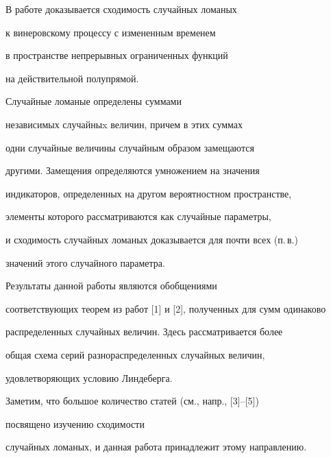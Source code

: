 \pagestyle{plain} %







\maketitle


\label{begin}








В работе доказывается сходимость случайных ломаных


к винеровскому процессу с измененным временем


в пространстве непрерывных ограниченных функций


на действительной полупрямой.


Случайные ломаные определены суммами


независимых случайныx величин, причем в этих суммах


одни случайные величины случайным образом замещаются


другими. Замещения определяются умножением на значения


индикаторов, определенных на другом вероятностном пространстве,


элементы которого рассматриваются как случайные параметры,


и сходимость случайных ломаных доказывается для почти всех (п.\,в.)


значений этого случайного параметра.


Результаты данной работы являются обобщениями


соответствующих теорем из работ [1] и [2], полученных для сумм одинаково


распределенных случайных величин. Здесь рассматривается более


общая схема серий разнораспределенных случайных величин,


удовлетворяющих условию Линдеберга.





Заметим, что большое количество статей (см., напр., [3]--[5])


посвящено изучению сходимости


случайных ломаных, и данная работа принадлежит этому направлению.






